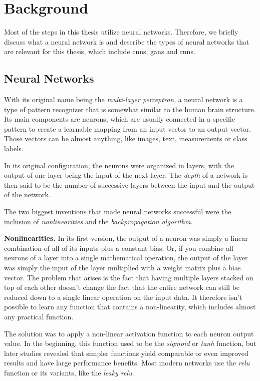 \chapter{Background}\label{chapter:background}

\glsresetall

Most of the steps in this thesis utilize neural networks. Therefore, we briefly discuss what a neural network is and describe the types of neural networks that are relevant for this thesis, which include \glspl{cnn}, \glspl{gan} and \glspl{rnn}.

\section{Neural Networks}
With its original name being the \emph{multi-layer perceptron}, a neural network is a type of pattern recognizer that is somewhat similar to the human brain structure. Its main components are neurons, which are usually connected in a specific pattern to create a learnable mapping from an input vector to an output vector. Those vectors can be almost anything, like images, text, measurements or class labels.

In its original configuration, the neurons were organized in layers, with the output of one layer being the input of the next layer. The \emph{depth} of a network is then said to be the number of successive layers between the input and the output of the network.

The two biggest inventions that made neural networks successful were the inclusion of \emph{nonlinearities} and the \emph{backpropagation algorithm}.

\textbf{Nonlinearities.} In its first version, the output of a neuron was simply a linear combination of all of its inputs plus a constant bias. Or, if you combine all neurons of a layer into a single mathematical operation, the output of the layer was simply the input of the layer multiplied with a weight matrix plus a bias vector. The problem that arises is the fact that having multiple layers stacked on top of each other doesn't change the fact that the entire network can still be reduced down to a single linear operation on the input data. It therefore isn't possible to learn any function that contains a non-linearity, which includes almost any practical function.

The solution was to apply a non-linear activation function to each neuron output value. In the beginning, this function used to be the \emph{sigmoid} or \emph{tanh} function, but later studies revealed that simpler functions yield comparable or even improved results and have large performance benefits. Most modern networks use the \emph{relu} function or its variants, like the \emph{leaky relu}.

